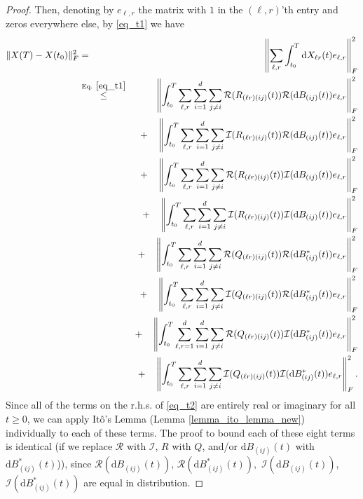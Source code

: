 \documentclass[11pt,letterpaper]{article}
\begin{document}
\begin{proof}
   
\noindent
Then, denoting by $e_{\ell, r}$ the matrix with $1$ in the $(\ell,r)$'th entry and zeros everywhere else, by \eqref{eq_t1} we have
%
\begin{eqnarray}\label{eq_t2}
    \|X(T) - X(t_0)  \|_F^2 &=&  \left\|\sum_{\ell, r} \int_{t_0}^T \mathrm{d}X_{\ell r}(t)e_{\ell, r}  \right\|_F^2 \nonumber\\
    &\stackrel{\textrm{Eq. }  \eqref{eq_t1}}{\leq}&  \left\| \int_{t_0}^T \sum_{\ell, r} \sum_{i=1}^{d} \sum_{j \neq i}\mathcal{R}(R_{(\ell r) (i j)}(t))\mathcal{R}(\mathrm{d}B_{(ij)}(t)) e_{\ell, r} \right\|_F^2  \nonumber\\
%
& & + \quad   \left\|\int_{t_0}^T \sum_{\ell, r} \sum_{i=1}^{d} \sum_{j \neq i} \mathcal{I}(R_{(\ell r) (i j)}(t)) \mathcal{R}(\mathrm{d}B_{(ij)}(t)) e_{\ell, r} \right\|_F^2\nonumber\\
%
& & + \quad \left\|\int_{t_0}^T \sum_{\ell, r} \sum_{i=1}^{d} \sum_{j \neq i} \mathcal{R}(R_{(\ell r) (i j)}(t)) \mathcal{I}(\mathrm{d}B_{(ij)}(t))e_{\ell, r} \right\|_F^2 \nonumber\\
%
& & + \quad \left\|\int_{t_0}^T \sum_{\ell, r} \sum_{i=1}^{d} \sum_{j \neq i} \mathcal{I}(R_{(\ell r) (i j)}(t)) \mathcal{I}(\mathrm{d}B_{(ij)}(t)) e_{\ell, r} \right\|_F^2\nonumber\\
%
& & + \quad  \left\|\int_{t_0}^T \sum_{\ell, r} \sum_{i=1}^{d} \sum_{j \neq i}\mathcal{R}(Q_{(\ell r) (i j)}(t))\mathcal{R}(\mathrm{d}B_{(ij)}^\ast(t))
e_{\ell, r} \right\|_F^2 \nonumber\\
%
& & + \quad \left\|\int_{t_0}^T \sum_{\ell, r} \sum_{i=1}^{d} \sum_{j \neq i} \mathcal{I}(Q_{(\ell r) (i j)}(t)) \mathcal{R}(\mathrm{d}B_{(ij)}^\ast(t))e_{\ell, r} \right\|_F^2\nonumber\\
%
& &  + \quad \left\|\int_{t_0}^T \sum_{\ell, r =1}^d \sum_{i=1}^{d} \sum_{j \neq i}\mathcal{R}(Q_{(\ell r) (i j)}(t)) \mathcal{I}(\mathrm{d}B_{(ij)}^\ast(t))e_{\ell, r} \right\|_F^2 \nonumber\\
%
& & + \quad \left\| \int_{t_0}^T \sum_{\ell, r} \sum_{i=1}^{d} \sum_{j \neq i}\mathcal{I}(Q_{(\ell r) (i j)}(t)) \mathcal{I}(\mathrm{d}B_{(ij)}^\ast(t))e_{\ell, r} \right\|_F^2.
\end{eqnarray}
%
Since all of the terms on the r.h.s. of \eqref{eq_t2} are entirely real or imaginary for all $t\geq 0$, we can apply  It\^o's Lemma (Lemma \ref{lemma_ito_lemma_new}) individually to each of these terms.
%
The proof to bound each of these eight terms is identical (if we replace $\mathcal{R}$ with $\mathcal{I}$, $R$ with $Q$, and/or $\mathrm{d}B_{(ij)}(t)$ with $\mathrm{d}B_{(ij)}^\ast(t)$)), since $\mathcal{R}(\mathrm{d}B_{(ij)}(t))$, $\mathcal{R}(\mathrm{d}B_{(ij)}^\ast(t)),$  $\mathcal{I}(\mathrm{d}B_{(ij)}(t))$, $\mathcal{I}(\mathrm{d}B_{(ij)}^\ast(t))$ are equal in distribution.

\end{proof}
\end{document}
